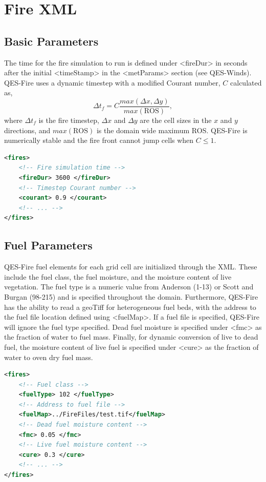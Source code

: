 \section{Fire XML}
\subsection{Basic Parameters}

The time for the fire simulation to run is defined under <fireDur> in seconds after the initial <timeStamp> in the <metParams> section (see QES-Winds). QES-Fire uses a dynamic timestep with a modified Courant number\cite{Ferziger2002}, $C$ calculated as,
\begin{equation}\label{eq:deltf}
    \Delta t_f = C \frac{max(\Delta x, \Delta y)}{max(\mathrm{ROS})},
\end{equation}
where $\Delta t_f$ is the fire timestep, $\Delta x$ and $\Delta y$ are the cell sizes in the $x$ and $y$ directions, and $max(\mathrm{ROS})$ is the domain wide maximum ROS. QES-Fire is numerically stable and the fire front cannot jump cells when $C\leq 1$. 
\begin{lstlisting}[language=XML]
<fires>
    <!-- Fire simulation time -->
    <fireDur> 3600 </fireDur>
    <!-- Timestep Courant number -->
    <courant> 0.9 </courant>
    <!-- ... -->
</fires>
\end{lstlisting}

\subsection{Fuel Parameters}

QES-Fire fuel elements for each grid cell are initialized through the XML. These include the fuel class, the fuel moisture, and the moisture content of live vegetation. The fuel type is a numeric value from Anderson (1-13) or Scott and Burgan (98-215) and is specified throughout the domain. Furthermore, QES-Fire has the ability to read a geoTiff for heterogeneous fuel beds, with the address to the fuel file location defined using <fuelMap>. If a fuel file is specified, QES-Fire will ignore the fuel type specified. Dead fuel moisture is specified under <fmc> as the fraction of water to fuel mass. Finally, for dynamic conversion of live to dead fuel, the moisture content of live fuel is specified under <cure> as the fraction of water to oven dry fuel mass.

\begin{lstlisting}[language=XML]
<fires>
    <!-- Fuel class -->
    <fuelType> 102 </fuelType>
    <!-- Address to fuel file -->
    <fuelMap>../FireFiles/test.tif</fuelMap>
    <!-- Dead fuel moisture content -->
    <fmc> 0.05 </fmc>
    <!-- Live fuel moisture content -->
    <cure> 0.3 </cure>
    <!-- ... -->
</fires>
\end{lstlisting}
